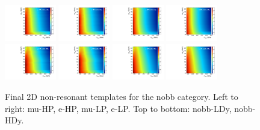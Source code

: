 \begin{figure}[htbp]
  \centering
  \includegraphics[width=0.2\textwidth]{fig/2Dfit/template_nonRes_mu_HP_nobb_LDy.pdf}
  \includegraphics[width=0.2\textwidth]{fig/2Dfit/template_nonRes_e_HP_nobb_LDy.pdf}
  \includegraphics[width=0.2\textwidth]{fig/2Dfit/template_nonRes_mu_LP_nobb_LDy.pdf}
  \includegraphics[width=0.2\textwidth]{fig/2Dfit/template_nonRes_e_LP_nobb_LDy.pdf}\\
  \includegraphics[width=0.2\textwidth]{fig/2Dfit/template_nonRes_mu_HP_nobb_HDy.pdf}
  \includegraphics[width=0.2\textwidth]{fig/2Dfit/template_nonRes_e_HP_nobb_HDy.pdf}
  \includegraphics[width=0.2\textwidth]{fig/2Dfit/template_nonRes_mu_LP_nobb_HDy.pdf}
  \includegraphics[width=0.2\textwidth]{fig/2Dfit/template_nonRes_e_LP_nobb_HDy.pdf}\\
  \caption{
    Final 2D non-resonant templates for the nobb category.
    Left to right: mu-HP, e-HP, mu-LP, e-LP.
    Top to bottom: nobb-LDy, nobb-HDy.
  }
  \label{fig:templates_nonRes_Run2}
\end{figure}

